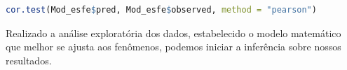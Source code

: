    \lstset{
 	language=R, %
 	caption= Teste de correlação em linguagem R,} %
 \begin{lstlisting}[language=R]
 	cor.test(Mod_esfe$pred, Mod_esfe$observed, method = "pearson")
 	 \end{lstlisting} 
 
 
\hspace*{1.25 cm} Realizado a análise exploratória dos dados, estabelecido o modelo matemático que melhor se ajusta aos  fenômenos, podemos iniciar a inferência sobre nossos resultados. 
%   

